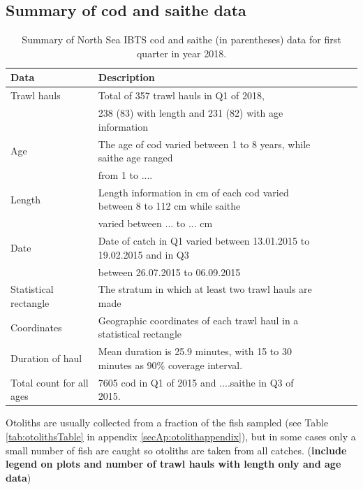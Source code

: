 \documentclass[a4paper 12pt]{article}
\numberwithin{equation}{section}
\begin{document}
\subsection{Summary of cod and saithe data}
\label{summary}
\begin{footnotesize}
\begin{table}[h!]
\caption{Summary of North Sea IBTS cod and saithe (in parentheses) data for first quarter in year 2018.}
\begin{tabular}{llllll}
\toprule
\bf Data&\bf Description \\
\midrule
Trawl hauls  & Total of 357 trawl hauls in Q1 of 2018,   \\
&238 (83)  with length and 231 (82) with age information\\[1.5ex]
Age &The age of cod varied between 1 to 8 years, while saithe age ranged \\
& from 1 to .... \\[1.5ex]
Length & Length information in cm of each cod varied between 8 to 112 cm while saithe \\
& varied between ... to ... cm \\[1.5ex]
Date&Date of catch in Q1 varied between 13.01.2015 to 19.02.2015 and in Q3 \\
&between 26.07.2015 to 06.09.2015 \\[1.5ex]
Statistical rectangle & The stratum in  which at least two trawl hauls are made \\[1.5ex]
Coordinates & Geographic coordinates of each trawl haul in a statistical rectangle \\[1.5ex]
Duration of haul & Mean duration is 25.9 minutes, with 15  to 30 minutes as 90\% coverage interval. \\[1.5ex]
Total count for all ages & 7605 cod in Q1 of 2015 and ....saithe in Q3 of 2015. \\[0.5ex]
\bottomrule
\end{tabular}
\label{tab:data2015}
\end{table}
\end{footnotesize}

Otoliths are usually collected from a fraction of the fish sampled (see Table \ref{tab:otolithsTable} in appendix \ref{secAp:otolithappendix}), but in some cases only a small number of fish are caught so otoliths are taken from all catches. ({\bf include legend on plots and number of trawl hauls with length only and age data})
\end{document}
